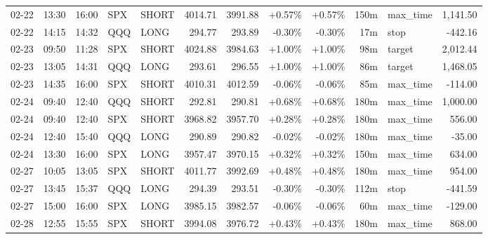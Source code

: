 \documentclass[11pt,a4paper,twoside]{article}
\begin{document}
\begin{center}
\begin{longtable}{>{\color{txtmain}}l l l l l r r r r r >{\color{txtmain}}l r}
02-22 & 13:30 & 16:00 & SPX & SHORT & 4014.71 & 3991.88 & \textcolor{wingreen}{+0.57\%} & \textcolor{wingreen}{+0.57\%} & 150m & max\_time & \textcolor{wingreen}{1,141.50} \\
02-22 & 14:15 & 14:32 & QQQ & LONG & 294.77 & 293.89 & \textcolor{lossred}{-0.30\%} & \textcolor{lossred}{-0.30\%} & 17m & stop & \textcolor{lossred}{-442.16} \\
02-23 & 09:50 & 11:28 & SPX & SHORT & 4024.88 & 3984.63 & \textcolor{wingreen}{+1.00\%} & \textcolor{wingreen}{+1.00\%} & 98m & target & \textcolor{wingreen}{2,012.44} \\
02-23 & 13:05 & 14:31 & QQQ & LONG & 293.61 & 296.55 & \textcolor{wingreen}{+1.00\%} & \textcolor{wingreen}{+1.00\%} & 86m & target & \textcolor{wingreen}{1,468.05} \\
02-23 & 14:35 & 16:00 & SPX & SHORT & 4010.31 & 4012.59 & \textcolor{lossred}{-0.06\%} & \textcolor{lossred}{-0.06\%} & 85m & max\_time & \textcolor{lossred}{-114.00} \\
02-24 & 09:40 & 12:40 & QQQ & SHORT & 292.81 & 290.81 & \textcolor{wingreen}{+0.68\%} & \textcolor{wingreen}{+0.68\%} & 180m & max\_time & \textcolor{wingreen}{1,000.00} \\
02-24 & 09:40 & 12:40 & SPX & SHORT & 3968.82 & 3957.70 & \textcolor{wingreen}{+0.28\%} & \textcolor{wingreen}{+0.28\%} & 180m & max\_time & \textcolor{wingreen}{556.00} \\
02-24 & 12:40 & 15:40 & QQQ & LONG & 290.89 & 290.82 & \textcolor{lossred}{-0.02\%} & \textcolor{lossred}{-0.02\%} & 180m & max\_time & \textcolor{lossred}{-35.00} \\
02-24 & 13:30 & 16:00 & SPX & LONG & 3957.47 & 3970.15 & \textcolor{wingreen}{+0.32\%} & \textcolor{wingreen}{+0.32\%} & 150m & max\_time & \textcolor{wingreen}{634.00} \\
02-27 & 10:05 & 13:05 & SPX & SHORT & 4011.77 & 3992.69 & \textcolor{wingreen}{+0.48\%} & \textcolor{wingreen}{+0.48\%} & 180m & max\_time & \textcolor{wingreen}{954.00} \\
02-27 & 13:45 & 15:37 & QQQ & LONG & 294.39 & 293.51 & \textcolor{lossred}{-0.30\%} & \textcolor{lossred}{-0.30\%} & 112m & stop & \textcolor{lossred}{-441.59} \\
02-27 & 15:00 & 16:00 & SPX & LONG & 3985.15 & 3982.57 & \textcolor{lossred}{-0.06\%} & \textcolor{lossred}{-0.06\%} & 60m & max\_time & \textcolor{lossred}{-129.00} \\
02-28 & 12:55 & 15:55 & SPX & SHORT & 3994.08 & 3976.72 & \textcolor{wingreen}{+0.43\%} & \textcolor{wingreen}{+0.43\%} & 180m & max\_time & \textcolor{wingreen}{868.00} \\

\end{longtable}
\end{center}
\end{document}
